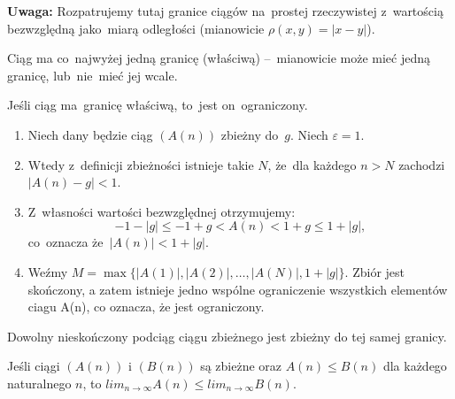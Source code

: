 \textbf{Uwaga:} Rozpatrujemy tutaj granice ciągów na~prostej rzeczywistej z~wartością bezwzględną jako~miarą odległości (mianowicie $\rho(x, y) = \left|x - y\right|$).

\begin{fakt}
Ciąg ma co~najwyżej jedną granicę (właściwą) –~mianowicie może mieć jedną granicę, lub~nie~mieć jej wcale.
\end{fakt}

\begin{tw}
    Jeśli ciąg ma~granicę właściwą, to~jest on~ograniczony.
\end{tw}
\begin{dow}
    \begin{enumerate}
        \item Niech dany będzie ciąg $(A(n))$ zbieżny do~$g$. Niech $\varepsilon=1$. 
        \item Wtedy z~definicji zbieżności istnieje takie $N$, że~dla każdego $n>N$ zachodzi $|A(n)-g| < 1$.
        \item Z~własności wartości bezwzględnej otrzymujemy: $$ -1-|g|\leqslant -1+g<A(n)<1+g \leqslant 1+|g|, $$ co~oznacza że~$|A(n)|<1+|g|$.
        \item Weźmy $M=\max\{|A(1)|, |A(2)|, \dots, |A(N)|, 1+|g|\}$. Zbiór jest skończony, a zatem istnieje jedno wspólne ograniczenie wszystkich elementów ciagu A(n), co oznacza, że jest ograniczony.~\cite{granice1}
    \end{enumerate}
\end{dow}

\begin{fakt}
    Dowolny nieskończony podciąg ciągu zbieżnego jest zbieżny do tej samej granicy.
\end{fakt}

\begin{fakt}
    Jeśli ciągi $(A(n))$ i $(B(n))$ są zbieżne oraz $ A(n) \leqslant B(n)$ dla każdego naturalnego $n$, to $lim_{n \to \infty} A(n) \leqslant lim_{n \to \infty} B(n)$.
\end{fakt}

